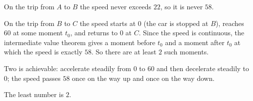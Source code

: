 On the trip from \(A\) to \(B\) the speed never exceeds \(22\), so it is never \(58\).

On the trip from \(B\) to \(C\) the speed starts at \(0\) (the car is stopped at \(B\)), reaches \(60\) at some moment \(t_0\), and returns to \(0\) at \(C\). Since the speed is continuous, the intermediate value theorem gives a moment before \(t_0\) and a moment after \(t_0\) at which the speed is exactly \(58\). So there are at least \(2\) such moments.

Two is achievable: accelerate steadily from \(0\) to \(60\) and then decelerate steadily to \(0\); the speed passes \(58\) once on the way up and once on the way down.

The least number is \(\boxed{2}\).
